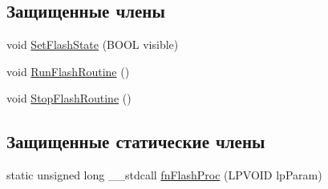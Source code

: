 \subsection*{Защищенные члены}
\begin{DoxyCompactItemize}
\item 
void \hyperlink{class_selection_a240bf3226d6ab1de5e9a958c8940cad7}{Set\-Flash\-State} (B\-O\-O\-L visible)
\item 
void \hyperlink{class_selection_a90033e720a75b54bf8623df01dc16241}{Run\-Flash\-Routine} ()
\item 
void \hyperlink{class_selection_a7a04270c06607b5fae8a182d39bdf301}{Stop\-Flash\-Routine} ()
\end{DoxyCompactItemize}
\subsection*{Защищенные статические члены}
\begin{DoxyCompactItemize}
\item 
static unsigned long \-\_\-\-\_\-stdcall \hyperlink{class_selection_a768b30225e90c1973f3cd895a6ca9709}{fn\-Flash\-Proc} (L\-P\-V\-O\-I\-D lp\-Param)
\end{DoxyCompactItemize}
